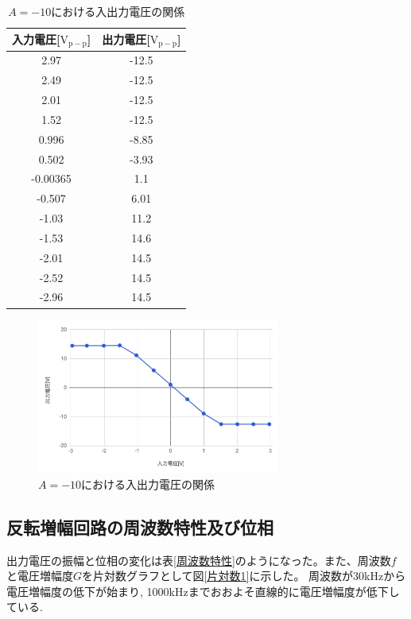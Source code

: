 \documentclass[a4paper,11pt,uplatex]{jsarticle}
\begin{document}
\begin{table}[H]
	\caption{$A=-10$における入出力電圧の関係}
	\label{A=-10表}
	\begin{center}
    \begin{tabular}[H]{|c|c|}\hline
      入力電圧[$\mathrm{V_{p-p}}$] & 出力電圧[$\mathrm{V_{p-p}}$] \\ \hline
      2.97 & -12.5 \\ \hline
      2.49 & -12.5 \\ \hline
      2.01 & -12.5 \\ \hline
      1.52 & -12.5 \\ \hline
      0.996 & -8.85 \\ \hline
      0.502 & -3.93 \\ \hline
      -0.00365 & 1.1 \\ \hline
      -0.507 & 6.01 \\ \hline
      -1.03 & 11.2 \\ \hline
      -1.53 & 14.6 \\ \hline
      -2.01 & 14.5 \\ \hline
      -2.52 & 14.5 \\ \hline
      -2.96 & 14.5 \\ \hline
    \end{tabular}
\end{center}
\end{table}

\begin{figure}[H]
	\begin{center}
		\includegraphics[width=8cm]{画像/A=-10入出力.png}
		\caption{$A=-10$における入出力電圧の関係}
		\label{入出力電圧2}
	\end{center}
\end{figure}

\subsection{反転増幅回路の周波数特性及び位相}
出力電圧の振幅と位相の変化は表\ref{周波数特性}のようになった。また、周波数$f$と電圧増幅度$G$を片対数グラフとして図\ref{片対数1}に示した。
周波数が30kHzから電圧増幅度の低下が始まり, 1000kHzまでおおよそ直線的に電圧増幅度が低下している.
\end{document}
